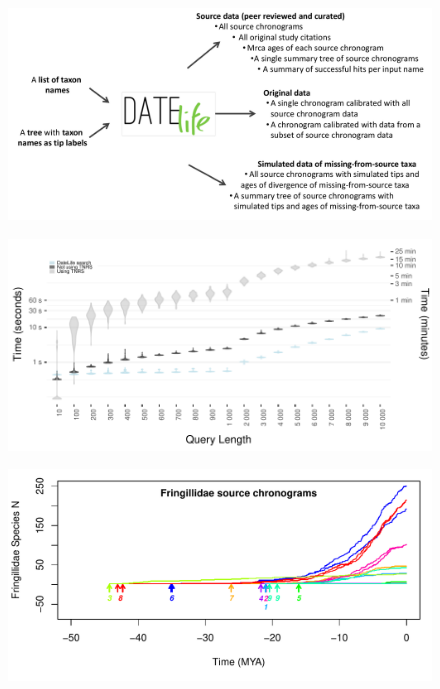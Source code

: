 \documentclass[]{article}
\begin{document}
\newpage

\begin{figure}[!h]
\includegraphics{Fig1.pdf}
\caption{}
\label{fig:workflow}
\end{figure}

\newpage

\begin{figure}[!h]
\includegraphics[width=1\linewidth]{fig_runtime1.pdf}
\caption{}
\label{fig:runtime1}
\end{figure}

\newpage

\begin{figure}[!h]
\includegraphics[width=1\linewidth]{fig_schronograms1.pdf}
\caption{}
\label{fig:schronograms1}
\end{figure}
\end{document}

